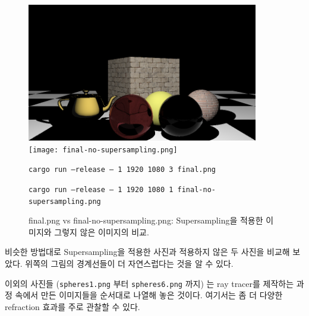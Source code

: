 \documentclass[11pt, a4paper]{article}
\begin{document}
\begin{figure}[H]
  \centering
  \includegraphics[width=0.9\textwidth]{final.png}
  \texttt{[image: final-no-supersampling.png]}
  \caption{final.png vs final-no-supersampling.png: Supersampling을 적용한 이미지와 그렇지 않은 이미지의 비교.}
  \texttt{cargo run --release -- 1 1920 1080 3 final.png}

  \texttt{cargo run --release -- 1 1920 1080 1 final-no-supersampling.png}
\end{figure}

비슷한 방법대로 Supersampling을 적용한 사진과 적용하지 않은 두 사진을 비교해 보았다. 위쪽의 그림의 경계선들이 더 자연스럽다는 것을 알 수 있다.

이외의 사진들 (\texttt{spheres1.png} 부터 \texttt{spheres6.png} 까지) 는 ray tracer를 제작하는 과정 속에서 만든 이미지들을 순서대로 나열해 놓은 것이다. 여기서는 좀 더 다양한 refraction 효과를 주로 관찰할 수 있다.
\end{document}
